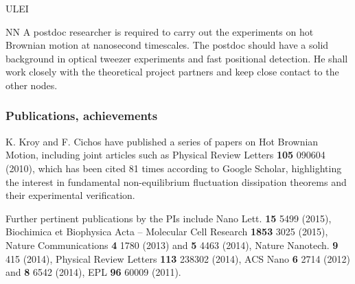 \begin{sitedescription}{ULEI}
\begin{participant}[type=res,PM=36,salary=5500]{NN}
A postdoc researcher is required to carry out the experiments on hot Brownian motion at nanosecond timescales. The postdoc should have a solid background in optical tweezer experiments and fast positional detection. He shall work closely with the theoretical project partners and keep close contact to the other nodes.
\end{participant}

\subsubsection*{Publications, achievements}

\begin{compactenum}
\item K. Kroy and F. Cichos have published a series of papers on Hot Brownian Motion, including joint articles such as 
Physical Review Letters {\bf 105} 090604 (2010), which has been cited 81 times according to Google Scholar, 
highlighting the interest in fundamental non-equilibrium fluctuation dissipation theorems and their experimental verification.

\item Further pertinent publications by the PIs include Nano Lett. {\bf 15} 5499 (2015), 
Biochimica et Biophysica Acta -- Molecular Cell Research {\bf 1853} 3025 (2015),
Nature Communications {\bf 4} 1780 (2013) and {\bf 5} 4463 (2014),
Nature Nanotech. {\bf 9} 415 (2014), Physical Review Letters {\bf 113} 238302 (2014), 
ACS Nano {\bf 6} 2714 (2012) and {\bf 8} 6542 (2014), EPL {\bf 96} 60009 (2011).






\end{compactenum}
\end{sitedescription}
